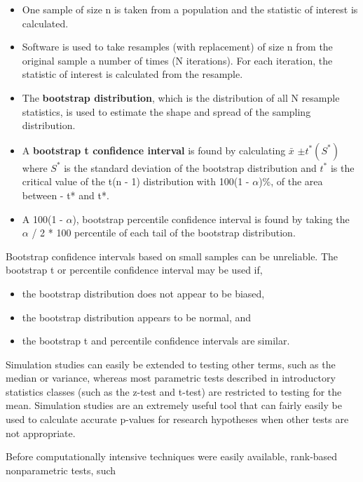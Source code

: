 \documentclass[
]{report}
\providecommand{\tightlist}{%
  \setlength{\itemsep}{0pt}\setlength{\parskip}{0pt}}
\begin{document}
\begin{itemize}
\tightlist
\item
  One sample of size n is taken from a population and the statistic of interest is calculated.
\item
  Software is used to take resamples (with replacement) of size n from the original sample a number of
  times (N iterations). For each iteration, the statistic of interest is calculated from the resample.
\item
  The \textbf{bootstrap distribution}, which is the distribution of all N resample statistics, is used to estimate
  the shape and spread of the sampling distribution.
\item
  A \textbf{bootstrap t confidence interval} is found by calculating \(\bar{x}\) \(\pm t^*(S^*)\) where \(S^*\) is the standard
  deviation of the bootstrap distribution and \(t^*\) is the critical value of the t(n - 1) distribution with
  100(1 - \(\alpha\))\%, of the area between - t* and t*.
\item
  A 100(1 - \(\alpha\)), bootstrap percentile confidence interval is found by taking the \(\alpha\) / 2 * 100
  percentile of each tail of the bootstrap distribution.
\end{itemize}

Bootstrap confidence intervals based on small samples can be unreliable. The bootstrap t or percentile confidence interval may be used if,

\begin{itemize}
\tightlist
\item
  the bootstrap distribution does not appear to be biased,
\item
  the bootstrap distribution appears to be normal, and
\item
  the bootstrap t and percentile confidence intervals are similar.
\end{itemize}

Simulation studies can easily be extended to testing other terms, such as the median or variance, whereas most parametric tests described in introductory statistics classes (such as the z-test and t-test) are restricted to testing for the mean. Simulation studies are an extremely useful tool that can fairly easily be used to calculate accurate p-values for research hypotheses when other tests are not appropriate.

Before computationally intensive techniques were easily available, rank-based nonparametric tests, such
\end{document}
